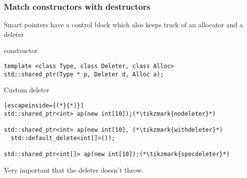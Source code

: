 \documentclass[11pt,a4paper,dvipsnames,usenames]{beamer}
\newcommand{\tikzmark}[1]{\tikz[overlay,remember picture] \node (#1) {};}
\newcommand{\object}[1]{{\ttfamily \color{OliveGreen}#1}}
\newcommand{\std}[1]{{\ttfamily {\color{RoyalBlue} std::}{\color{OliveGreen}#1}}}
\newcommand{\sharedptr}{\std{shared\_ptr}}
\begin{document}
\begin{frame}[fragile]
  \frametitle{Match constructors with destructors}

  Smart pointers have a control block which also keeps track of an allocator and a deleter

  \begin{exampleblock}{{\sharedptr{}} {\color{codeblockcolor}constructor}}
  \begin{lstlisting}
template <class Type, class Deleter, class Alloc>
std::shared_ptr(Type * p, Deleter d, Alloc a);
  \end{lstlisting}
  \end{exampleblock}

  \begin{exampleblock}{Custom deleter}
    \begin{lstlisting}[escapeinside={(*}{*)}]
std::shared_ptr<int> ap(new int[10]);(*\tikzmark{nodeleter}*)

std::shared_ptr<int> ap(new int[10], (*\tikzmark{withdeleter}*)
  std::default_delete<int[]>());

std::shared_ptr<int[]> ap(new int[10]);(*\tikzmark{specdeleter}*)
    \end{lstlisting}
  \end{exampleblock}


  Very important that the deleter doesn't throw.

\end{frame}
\end{document}

